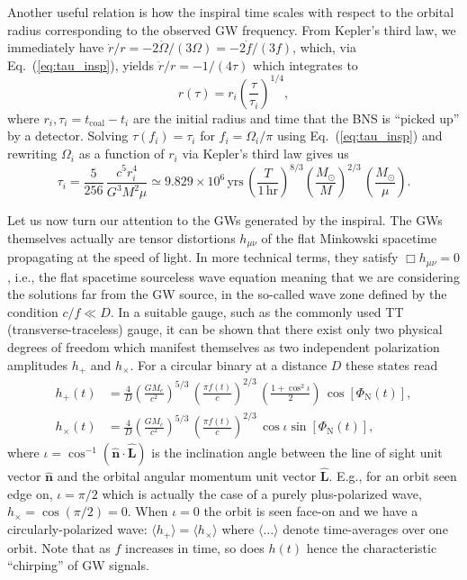 \documentclass[11pt,a4paper]{article}
\newcommand{\f}{\frac}
\newcommand{\be}{\begin{equation}}
\newcommand{\ee}{\end{equation}}
\begin{document}
Another useful relation is how the inspiral time scales with respect to the orbital radius corresponding to the observed GW frequency.
From Kepler's third law, we immediately have $\dot{r}/r= -2\dot{\Omega}/(3\Omega)=-2\dot{f}/(3f)$, which, via Eq.~(\ref{eq:tau_insp}),
yields $\dot{r}/r= -1/(4\tau)$ which integrates to
%
\be
r(\tau)=r_i \left(\f{\tau}{\tau_i}\right)^{1/4}\label{eq:r_of_tau},
\ee
%
where $r_i, \tau_i=t_\text{coal}-t_i$ are the initial radius and time that the BNS
is ``picked up'' by a detector. Solving $\tau(f_i)=\tau_i$ for $f_i=\Omega_i/\pi$ using Eq.~(\ref{eq:tau_insp}) and rewriting $\Omega_i$ as a function of $r_i$ via
Kepler's third law gives us
%
\be
\tau_i = \f{5}{256}\, \f{c^5 r_i^4}{G^3 M^2 \mu}\simeq 9.829\times 10^6\,\text{yrs}\, \left(\f{T}{1\,\text{hr}}\right)^{8/3} \left(\f{M_\odot}{M}\right)^{2/3}\,\left(\f{M_\odot}{\mu}\right) \label{eq:tau_of_r}.
\ee
%

Let us now turn our attention to the GWs generated by the inspiral.
The GWs themselves actually are tensor distortions $h_{\mu\nu}$ of the flat Minkowski
spacetime propagating at the speed of light.
In more technical terms, they satisfy $\Box h_{\mu\nu} = 0$, i.e., the flat spacetime sourceless wave equation
meaning that we are considering the solutions far from the GW source, in the so-called wave zone defined by the condition $ c/f \ll D$.
In a suitable gauge, such as the commonly used TT (transverse-traceless) gauge, it can be shown that
there exist only two physical degrees of freedom which manifest themselves
as two independent polarization amplitudes $h_+$ and $h_\times$. %
For a circular binary at a distance $D$ these states read
%
\begin{align}
 h_+(t) &= \f{4}{D}\left(\f{G M_c}{c^2}\right)^{5/3}\, \left(\f{\pi f(t)}{c}\right)^{2/3}\, \left(\f{1+\cos^2\iota}{2}\right)\, \cos[\Phi_\text{N}(t)],\label{eq:hplus_TD}\\
 h_\times(t) & = \f{4}{D}\left(\f{G M_c}{c^2}\right)^{5/3}\, \left(\f{\pi f(t)}{c}\right)^{2/3}\,\cos\iota \sin[\Phi_\text{N}(t)]\label{eq:hcross_TD},
\end{align}
%
%
where $\iota=\cos^{-1}(\mathbf{\hat{n}}\cdot{\mathbf{\hat{L}}}) $ is the inclination angle between the line of sight unit vector $\mathbf{\hat{n}} $ and the orbital angular momentum unit vector $\mathbf{\hat{L}}$. 
E.g., for an orbit seen edge on, $\iota = \pi/2$ which is actually the case of a purely plus-polarized wave, $h_\times=\cos(\pi/2)=0$.
When $\iota=0$ the orbit is seen face-on and we have a circularly-polarized wave: $\langle h_+ \rangle = \langle h_\times\rangle$ where $\langle \ldots \rangle$
denote time-averages over one orbit. Note that as $f$ increases in time, so does $h(t)$ hence the characteristic ``chirping'' of GW signals.
\end{document}
